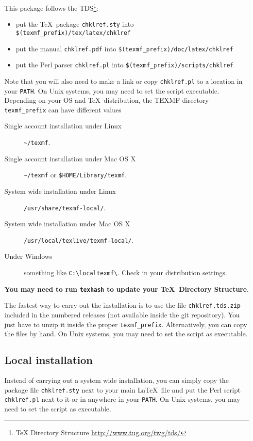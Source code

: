 \documentclass[a4paper,11pt,twoside]{article}
\begin{document}
This package follows the TDS\footnote{TeX Directory Structure
  \url{http://www.tug.org/twg/tds/}}:
\begin{itemize}
  \item  put the \TeX\ package \verb!chklref.sty! into \verb!$(texmf_prefix)/tex/latex/chklref!
  \item  put the manual \verb!chklref.pdf! into \verb!$(texmf_prefix)/doc/latex/chklref!
  \item  put the Perl parser \verb!chklref.pl! into \verb!$(texmf_prefix)/scripts/chklref!
\end{itemize}
Note that you will also need to make a link or copy \verb!chklref.pl! to a location in your \texttt{PATH}. On Unix systems, you may need to set the script executable. \\

Depending on your OS and \TeX\ distribution, the TEXMF directory \verb!texmf_prefix! can have different values
\begin{description}
  \item[Single account installation under Linux] \verb!~/texmf!.
  \item[Single account installation under Mac OS X] \verb!~/texmf! or \verb!$HOME/Library/texmf!.
  \item[System wide installation under Linux] \verb!/usr/share/texmf-local/!.
  \item[System wide installation under Mac OS X] \verb!/usr/local/texlive/texmf-local/!.
  \item[Under Windows] something like \verb!C:\localtexmf\!. Check in your distribution settings.
\end{description}

\noindent \textbf{You may need to run \texttt{texhash} to update your \TeX\ Directory Structure.}

The fastest way to carry out the installation is to use the file \verb!chklref.tds.zip! included in the numbered releases (not available inside the git repository). You just have to unzip it inside the proper \verb!texmf_prefix!. Alternatively, you can copy the files by hand. On Unix systems, you may need to set the script as executable.

\subsection{Local installation}

Instead of carrying out a system wide installation, you can simply copy the package file \verb!chklref.sty! next to your main \LaTeX\ file and put the Perl script \verb!chklref.pl! next to it or in anywhere in your \texttt{PATH}. On Unix systems, you may need to set the script as executable.
\end{document}
